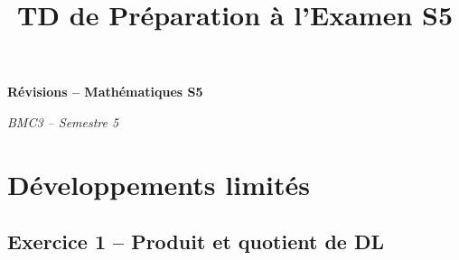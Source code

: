 

\title{TD de Préparation à l'Examen S5}
\author{}
\date{}

\newenvironment{solution}
    {\par\vspace{0.5em}\begin{mdframed}[backgroundcolor=ThemeLight,linewidth=0.5pt]\noindent\textbf{Solution :}\par}
    {\end{mdframed}\par\vspace{0.5em}}


\sffamily

\begin{center}
    {\Large\textbf{Révisions -- Mathématiques S5}}
    
    \vspace{0.5em}
    {\textit{BMC3 -- Semestre 5}}
\end{center}

\vspace{1em}

\section*{Développements limités}

\subsection*{Exercice 1 -- Produit et quotient de DL}

